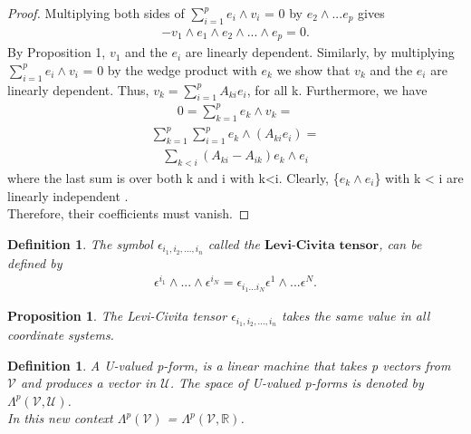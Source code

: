 \documentclass[12pt,a4paper]{article}
\newtheorem{defn}[thm]{Definition}
\newtheorem{prop}{Proposition}
\begin{document}
\begin{proof}
Multiplying both sides of $\sum^{p}_{i=1} e_i \wedge v_i$ = 0 by $e_2 \wedge ... e_p$ gives
\begin{align*}
-v_1 \wedge e_1 \wedge e_2 \wedge ... \wedge e_p = 0.
\end{align*}
By Proposition 1, $v_1$ and the $e_i$ are linearly dependent. Similarly, by
multiplying $\sum^{p}_{i=1} e_i \wedge v_i$ = 0 by the wedge product with $e_k$  we
show that $v_k$ and  the $e_i$ are linearly dependent. Thus, $v_k = \sum^p_{i=1} A_{ki} e_i$, for all k. Furthermore, we have\\
\begin{align*}
 0 = \sum^{p}_{k=1} e_k \wedge v_k  = 
 \end{align*}
 \begin{align*}
 \sum^{p}_{k=1} \sum^{p}_{i=1} e_k \wedge ( A_{ki} e_i) = 
 \end{align*}
 \begin{align*}
 \sum_{k<i} (A_{ki} - A_{ik}) e_k \wedge e_i
\end{align*}
where the last sum is over both k and i with k<i. Clearly, \{$e_k \wedge e_i$\} with k <
i are linearly independent .\\ Therefore, their coefficients must
vanish.
\end{proof}
\begin{defn}
The symbol $\epsilon_{i_1, i_2, ... , i_n}$ called the $\textbf{Levi-Civita tensor}$, can be defined by
\begin{eqnarray*}
\epsilon^{i_1} \wedge ... \wedge \epsilon^{i_N} = \epsilon_{i_1 ... i_N} \epsilon^1 \wedge ... \epsilon^N.
\end{eqnarray*}
\end{defn}
\begin{prop}
The Levi-Civita tensor $\epsilon_{i_1, i_2, ... , i_n}$ takes the same value in
all coordinate systems.
\end{prop}
\begin{defn}
A U-valued p-form, is a linear machine that takes p
vectors from $\mathcal{V}$ and produces a vector in $\mathcal{U}$. The space of U-valued p-forms
is denoted by $\Lambda^{p}(\mathcal{V}, \mathcal{U})$. \\ In this new context $\Lambda^{p}(\mathcal{V})$ =  $\Lambda^{p}(\mathcal{V}, \mathbb{R})$.
\end{defn}
\end{document}

